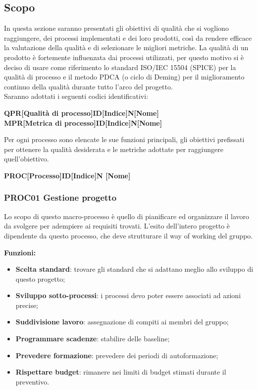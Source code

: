\documentclass[../piano_di_qualifica.tex]{subfiles}
\begin{document}
\subsection{Scopo}
In questa sezione saranno presentati gli obiettivi di qualità che si vogliono raggiungere, dei processi implementati e dei loro prodotti, così da rendere efficace la valutazione della qualità e di selezionare le migliori metriche.
La qualità di un prodotto è fortemente influenzata dai processi utilizzati, per questo motivo si è deciso di usare come riferimento lo standard ISO/IEC 15504 (SPICE) per la qualità di processo e il metodo PDCA (o ciclo di Deming) per il miglioramento continuo della qualità durante tutto l'arco del progetto.\\
Saranno adottati i seguenti codici identificativi:\par

\begin{center}
	      \textbf{QPR[Qualità di processo]ID[Indice]N[Nome]}\\
		\textbf{MPR[Metrica di processo]ID[Indice]N[Nome]}
\end{center}

Per ogni processo sono elencate le sue funzioni principali, gli obiettivi prefissati per ottenere la qualità desiderata e le metriche adottate per raggiungere quell’obiettivo.

\begin{center}
	\textbf{PROC[Processo]ID[Indice]N [Nome]}
\end{center}

\subsubsection{PROC01 Gestione progetto}
Lo scopo di questo macro-processo è quello di pianificare ed organizzare il lavoro da svolgere per adempiere ai requisiti trovati. L'esito dell'intero progetto è dipendente da questo processo, che deve strutturare il way of working del gruppo.

\textbf{Funzioni:}
\smallbreak
\begin{itemize}
	\item \textbf{Scelta standard}: trovare gli standard che si adattano meglio allo sviluppo di questo progetto;
	\item \textbf{Sviluppo sotto-processi}: i processi devo poter essere associati ad azioni precise;
	\item \textbf{Suddivisione lavoro}: assegnazione di compiti ai membri del gruppo;
	\item \textbf{Programmare scadenze}: stabilire delle baseline;
	\item \textbf{Prevedere formazione}: prevedere dei periodi di autoformazione;
	\item \textbf{Rispettare budget}: rimanere nei limiti di budget stimati durante il preventivo.
\end{itemize}
\end{document}
